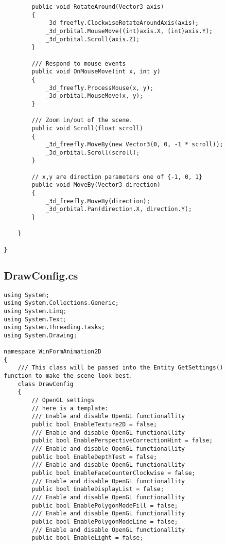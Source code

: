 \begin{scriptsize}
\begin{verbatim}
        public void RotateAround(Vector3 axis)
        {
            _3d_freefly.ClockwiseRotateAroundAxis(axis);
            _3d_orbital.MouseMove((int)axis.X, (int)axis.Y);
            _3d_orbital.Scroll(axis.Z);
        }

        /// Respond to mouse events
        public void OnMouseMove(int x, int y)
        {
            _3d_freefly.ProcessMouse(x, y);
            _3d_orbital.MouseMove(x, y);
        }

        /// Zoom in/out of the scene.
        public void Scroll(float scroll)
        {
            _3d_freefly.MoveBy(new Vector3(0, 0, -1 * scroll));
            _3d_orbital.Scroll(scroll);
        }

        // x,y are direction parameters one of {-1, 0, 1}
        public void MoveBy(Vector3 direction)
        {
            _3d_freefly.MoveBy(direction);
            _3d_orbital.Pan(direction.X, direction.Y);
        }

    }

}
\end{verbatim}
\subsection{DrawConfig.cs}
\begin{verbatim}
using System;
using System.Collections.Generic;
using System.Linq;
using System.Text;
using System.Threading.Tasks;
using System.Drawing;

namespace WinFormAnimation2D
{
    /// This class will be passed into the Entity GetSettings() function to make the scene look best.
    class DrawConfig
    {
        // OpenGL settings
        // here is a template:
        /// Enable and disable OpenGL functionallity
        public bool EnableTexture2D = false;
        /// Enable and disable OpenGL functionallity
        public bool EnablePerspectiveCorrectionHint = false;
        /// Enable and disable OpenGL functionallity
        public bool EnableDepthTest = false;
        /// Enable and disable OpenGL functionallity
        public bool EnableFaceCounterClockwise = false;
        /// Enable and disable OpenGL functionallity
        public bool EnableDisplayList = false;
        /// Enable and disable OpenGL functionallity
        public bool EnablePolygonModeFill = false;
        /// Enable and disable OpenGL functionallity
        public bool EnablePolygonModeLine = false;
        /// Enable and disable OpenGL functionallity
        public bool EnableLight = false;


\end{verbatim}
\end{scriptsize}
